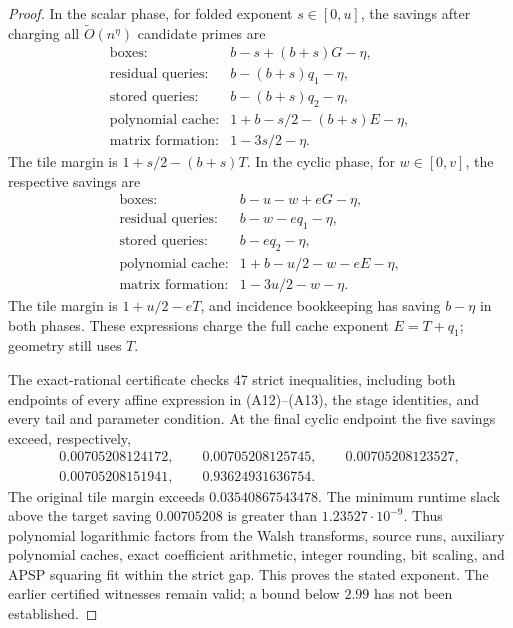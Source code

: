\documentclass[11pt]{article}
\newcommand{\softO}{\widetilde O}
\begin{document}
\begin{proof}
In the scalar phase, for folded exponent $s\in[0,u]$, the savings
after charging all $\softO(n^\eta)$ candidate primes are
\[
\begin{array}{ll}
\text{boxes:}&b-s+(b+s)G-\eta,\\
\text{residual queries:}&b-(b+s)q_1-\eta,\\
\text{stored queries:}&b-(b+s)q_2-\eta,\\
\text{polynomial cache:}&1+b-s/2-(b+s)E-\eta,\\
\text{matrix formation:}&1-3s/2-\eta.
\end{array}                                                   \tag{A12}
\]
The tile margin is $1+s/2-(b+s)T$. In the cyclic phase, for
$w\in[0,v]$, the respective savings are
\[
\begin{array}{ll}
\text{boxes:}&b-u-w+eG-\eta,\\
\text{residual queries:}&b-w-eq_1-\eta,\\
\text{stored queries:}&b-eq_2-\eta,\\
\text{polynomial cache:}&1+b-u/2-w-eE-\eta,\\
\text{matrix formation:}&1-3u/2-w-\eta.
\end{array}                                                   \tag{A13}
\]
The tile margin is $1+u/2-eT$, and incidence bookkeeping has saving
$b-\eta$ in both phases. These expressions charge the full cache
exponent $E=T+q_1$; geometry still uses $T$.

The exact-rational certificate checks 47 strict inequalities, including
both endpoints of every affine expression in (A12)--(A13), the stage
identities, and every tail and parameter condition. At the final cyclic
endpoint the five savings exceed, respectively,
\[
\begin{gathered}
 0.00705208124172,\qquad 0.00705208125745,\qquad
 0.00705208123527,\\ 0.00705208151941,\qquad
 0.93624931636754.
\end{gathered}
\]
The original tile margin exceeds $0.03540867543478$. The minimum
runtime slack above the target saving $0.00705208$ is greater than
$1.23527\cdot10^{-9}$. Thus polynomial logarithmic factors from the
Walsh transforms, source runs, auxiliary polynomial caches, exact
coefficient arithmetic, integer rounding, bit scaling, and APSP
squaring fit within the strict gap. This proves the stated exponent.
The earlier certified witnesses remain valid; a bound below $2.99$
has not been established.
\end{proof}
\end{document}
